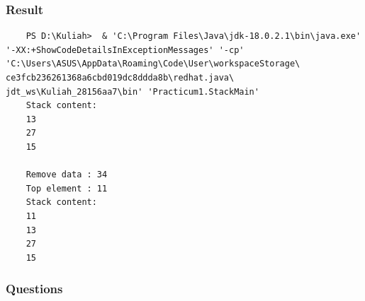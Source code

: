 \documentclass[12pt,titlepage]{article}
\begin{document}
\subsubsection{Result}

\begin{verbatim}
    PS D:\Kuliah>  & 'C:\Program Files\Java\jdk-18.0.2.1\bin\java.exe' '-XX:+ShowCodeDetailsInExceptionMessages' '-cp' 'C:\Users\ASUS\AppData\Roaming\Code\User\workspaceStorage\ ce3fcb236261368a6cbd019dc8ddda8b\redhat.java\ jdt_ws\Kuliah_28156aa7\bin' 'Practicum1.StackMain'
    Stack content: 
    13 
    27
    15

    Remove data : 34
    Top element : 11
    Stack content: 
    11
    13
    27
    15
\end{verbatim}

\subsubsection{Questions}
\end{document}
